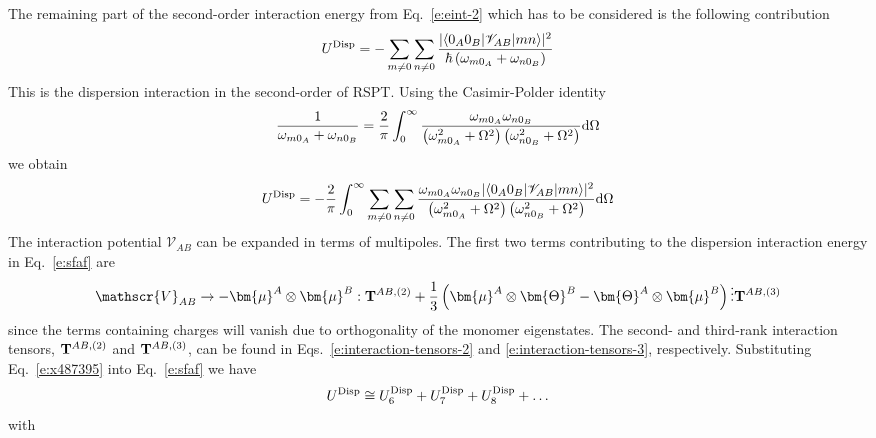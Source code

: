 \documentclass[b5paper,oneside,fleqn,11pt]{book}
\newcommand{\BM}[1]{\bm{#1}}
\begin{document}
\begin{refsection}
The remaining part of the second\hyp{}order interaction
energy from Eq.~\eqref{e:eint-2} which has to be considered
is the following contribution
%
\begin{equation} \label{e:eint-2-disp}
U^{\rm Disp} = - \sum_{m\ne 0} \sum_{n\ne 0} \frac{
\lvert \langle 0_A0_B \lvert \mathscr{V}_{AB} \rvert mn \rangle \rvert^2
}{\hbar \left( \omega_{m0_A} + \omega_{n0_B}\right)}
\end{equation}
%
This is the dispersion interaction in the second\hyp{}order of RSPT.
Using the Casimir\hyp{}Polder identity
%
\begin{equation} \label{e:Casimir-Polder}
\frac{1}{\omega_{m0_A}+\omega_{n0_B}} =\frac{2}{\pi} \int_0^{\infty} 
\frac{\omega_{m0_A}\omega_{n0_B}}
{\left(\omega_{m0_A}^2+\Omega^2\right)\left(\omega_{n0_B}^2+\Omega^2\right)} {\rm d}\Omega
\end{equation}
%
we obtain
%
\begin{equation} \label{e:sfaf}
U^{\rm Disp} =-\frac{2}{\pi}\int_0^{\infty} \sum_{m\ne 0} \sum_{n\ne 0}
\frac{\omega_{m0_A}\omega_{n0_B}
\lvert \langle 0_A0_B \lvert \mathscr{V}_{AB} \rvert mn \rangle \rvert^2
}
{\left(\omega_{m0_A}^2+\Omega^2\right)\left(\omega_{n0_B}^2+\Omega^2\right)} {\rm d}\Omega
\end{equation}
%
The interaction potential $\mathscr{V}_{AB}$ can be expanded in terms of multipoles. 
The first two terms contributing to the dispersion interaction energy 
in Eq.~\eqref{e:sfaf} are \citep{Smith.Ruedenberg.Gordon.Slipchenko.JCP.2012}
%
\begin{equation} \label{e:x487395}
\mathscr{V}_{AB} \rightarrow
- {\BM \mu}^A \otimes {\BM \mu}^B : {\bf T}^{AB,(2)} + \frac{1}{3} 
\left( 
 {\BM \mu}^A \otimes {\BM \Theta}^B - {\BM \Theta}^A \otimes {\BM \mu}^B
\right) \vdots {\bf T}^{AB,(3)}
\end{equation}
%
since the terms containing charges will vanish due to orthogonality 
of the monomer eigenstates. The second- and third\hyp{}rank interaction tensors,
${\bf T}^{AB,(2)}$ and ${\bf T}^{AB,(3)}$, 
can be found in Eqs.~\eqref{e:interaction-tensors-2} 
and \eqref{e:interaction-tensors-3}, respectively.
Substituting Eq.~\eqref{e:x487395} into Eq.~\eqref{e:sfaf} we have
%
\begin{equation}
 U^{\rm Disp} \cong  U^{\rm Disp}_6 + U^{\rm Disp}_7 + U^{\rm Disp}_8 + \ldots
\end{equation}
%
with
%
\begin{subequations} \label{e:udisp-6-7-8}
 \begin{align}

\end{align}
\end{subequations}
\end{refsection}
\end{document}
